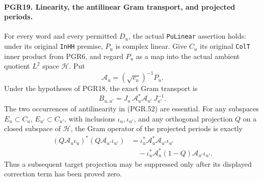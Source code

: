 \paragraph{PGR19. Linearity, the antilinear Gram transport, and projected periods.}
\label{claim:PGR19}
For every word and every permitted \(D_u\), the actual
\texttt{PuLinear} assertion holds: under its original
\texttt{InHH} premise, \(P_u\) is complex linear.
Give \(C_u\) its original \texttt{ColT} inner product from
PGR6, and regard \(P_u\) as a map into the actual ambient
quotient \(L^2\) space \(\mathcal H\).  Put
\[
 \mathcal A_u=(\sqrt{c_u})^{-1}P_u.
\tag{PGR.51}
\]
Under the hypotheses of PGR18, the exact Gram transport is
\[
 B_{u,u'}=J_u\,\mathcal A_u^*\mathcal A_{u'}\,J_{u'}^{-1}.
\tag{PGR.52}
\]
The two occurrences of antilinearity in (PGR.52) are essential.
For any subspaces \(E_u\subset C_u\), \(E_{u'}\subset C_{u'}\),
with inclusions \(\iota_u,\iota_{u'}\), and any orthogonal
projection \(Q\) on a closed subspace of \(\mathcal H\),
the Gram operator of the projected periods is exactly
\[
 \begin{split}
 (Q\mathcal A_u\iota_u)^*(Q\mathcal A_{u'}\iota_{u'})
   &=\iota_u^*\mathcal A_u^*\mathcal A_{u'}\iota_{u'}\\
   &\quad-\iota_u^*\mathcal A_u^*(1-Q)
                              \mathcal A_{u'}\iota_{u'}.
 \end{split}
\tag{PGR.53}
\]
Thus a subsequent target projection may be suppressed only after
its displayed correction term has been proved zero.
